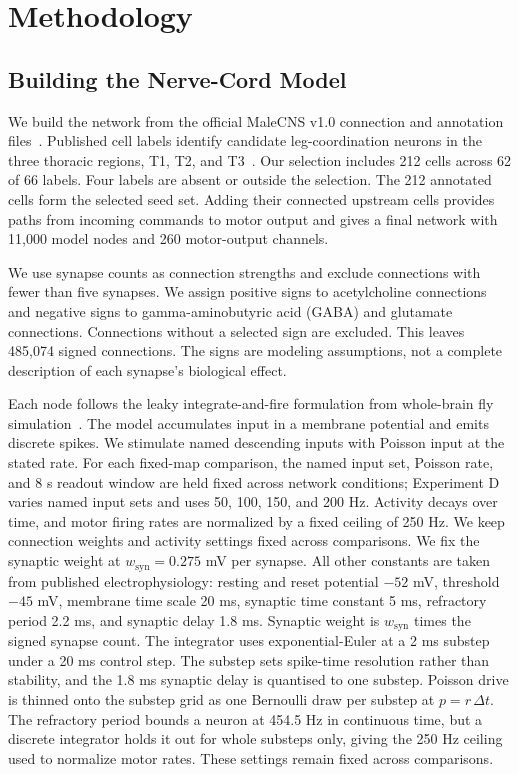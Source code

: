 \documentclass[conference]{IEEEtran}
\begin{document}
\section{Methodology}
\subsection{Building the Nerve-Cord Model}
We build the network from the official MaleCNS v1.0 connection and annotation files~\cite{malecns}. Published cell labels identify candidate leg-coordination neurons in the three thoracic regions, T1, T2, and T3~\cite{cheong2026premotor}. Our selection includes 212 cells across 62 of 66 labels. Four labels are absent or outside the selection. The 212 annotated cells form the selected seed set. Adding their connected upstream cells provides paths from incoming commands to motor output and gives a final network with 11,000 model nodes and 260 motor-output channels.

We use synapse counts as connection strengths and exclude connections with fewer than five synapses. We assign positive signs to acetylcholine connections and negative signs to gamma-aminobutyric acid (GABA) and glutamate connections. Connections without a selected sign are excluded. This leaves 485,074 signed connections. The signs are modeling assumptions, not a complete description of each synapse's biological effect.

Each node follows the leaky integrate-and-fire formulation from whole-brain fly simulation~\cite{jin2026flygm}. The model accumulates input in a membrane potential and emits discrete spikes. We stimulate named descending inputs with Poisson input at the stated rate. For each fixed-map comparison, the named input set, Poisson rate, and 8 s readout window are held fixed across network conditions; Experiment D varies named input sets and uses 50, 100, 150, and 200 Hz. Activity decays over time, and motor firing rates are normalized by a fixed ceiling of 250 Hz. We keep connection weights and activity settings fixed across comparisons. We fix the synaptic weight at $w_{\mathrm{syn}} = 0.275$ mV per synapse. All other constants are taken from published electrophysiology: resting and reset potential $-52$ mV, threshold $-45$ mV, membrane time scale 20 ms, synaptic time constant 5 ms, refractory period 2.2 ms, and synaptic delay 1.8 ms. Synaptic weight is $w_{\mathrm{syn}}$ times the signed synapse count. The integrator uses exponential-Euler at a 2 ms substep under a 20 ms control step. The substep sets spike-time resolution rather than stability, and the 1.8 ms synaptic delay is quantised to one substep. Poisson drive is thinned onto the substep grid as one Bernoulli draw per substep at $p = r\,\Delta t$. The refractory period bounds a neuron at 454.5 Hz in continuous time, but a discrete integrator holds it out for whole substeps only, giving the 250 Hz ceiling used to normalize motor rates. These settings remain fixed across comparisons.
\end{document}
